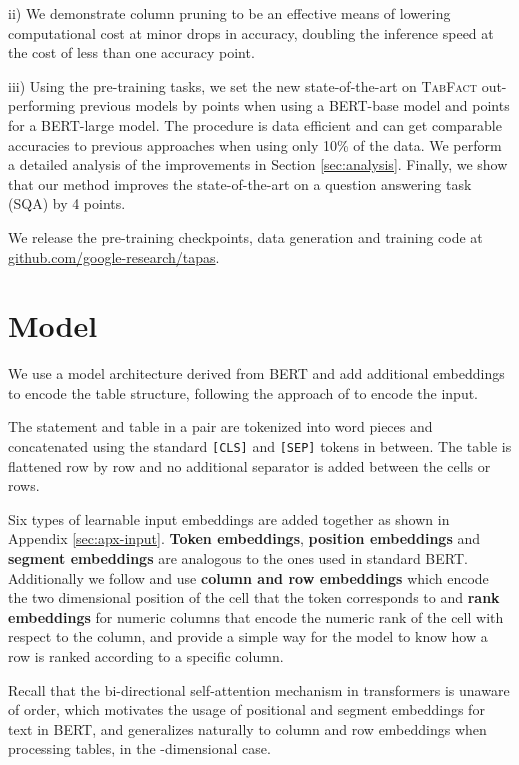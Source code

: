 \documentclass[11pt,a4paper]{article}
\newcommand{\sqa}{\textsc{SQA}\xspace}
\newcommand{\tabfact}{\textsc{TabFact}\xspace}
\newcommand\sota{state-of-the-art\xspace}
\newcommand{\bert}{\textsc{BERT}\xspace}
\theoremstyle{definition}
\begin{document}
ii)
We demonstrate column pruning to be an effective means of lowering computational cost at minor drops in accuracy, doubling the inference speed at the cost of less than one accuracy point.

iii) Using the pre-training tasks, we set the new \sota on \tabfact{} out-performing previous models by  points when using a \bert{}-base model and  points for a \bert{}-large model. The procedure is data efficient and can get comparable accuracies to previous approaches when using only 10\% of the data.
We perform a detailed analysis of the improvements in Section \ref{sec:analysis}.
Finally, we show that our method improves the \sota on a question answering task (\sqa{}) by 4 points.

We release the pre-training checkpoints, data generation and training code at \href{https://github.com/google-research/tapas}{github.com/google-research/tapas}.


 \section{Model}
\label{sec:model}



We use a model architecture derived from \bert{} and add additional embeddings to encode the table structure, following the approach of \citet{herzig-2020} to encode the input. 

The statement and table in a pair are tokenized into word pieces and concatenated using the standard \texttt{[CLS]} and \texttt{[SEP]} tokens in between. The table is flattened row by row and no additional separator is added between the cells or rows.

Six types of learnable input embeddings are added together as shown in Appendix \ref{sec:apx-input}. 
\textbf{Token embeddings}, \textbf{position embeddings} and \textbf{segment embeddings} are analogous to the ones used in standard \bert{}. 
Additionally we follow \citet{herzig-2020} and use \textbf{column and row embeddings} which encode the two dimensional position of the cell that the token corresponds to and
\textbf{rank embeddings} for numeric columns that encode the numeric rank of the cell with respect to the column, and provide a simple way for the model to know how a row is ranked according to a specific column.

Recall that the bi-directional self-attention mechanism in transformers is unaware of order, which motivates the usage of positional and segment embeddings for text in \bert{}, and generalizes naturally to column and row embeddings when processing tables, in the -dimensional case.
\end{document}
